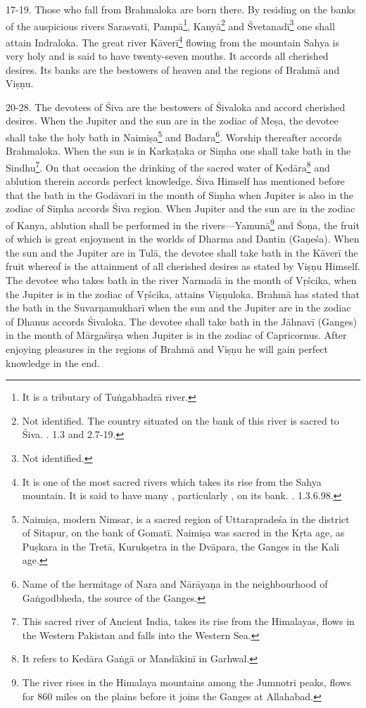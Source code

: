 17-19. Those who fall from Brahmaloka are born there. By residing on the banks
of the auspicious rivers Sarasvatī, Pampā\footnote{It is a tributary of
Tuṅgabhadrā river.}, Kanyā\footnote{Not identified. The country situated on
the bank of this river is sacred to Śiva. . 1.3 and 2.7-19.} and
Śvetanadī\footnote{Not identified.} one shall attain Indraloka. The great river
Kāverī\footnote{It is one of the most sacred rivers which takes its rise from
the Sahya mountain. It is said to have many , particularly , on its bank. . 1.3.6.98.} flowing from the mountain Sahya is
very holy and is said to have twenty-seven mouths. It accords all cherished
desires. Its banks are the bestowers of heaven and the regions of Brahmā and
Viṣṇu.

20-28. The devotees of Śiva are the bestowers of Śivaloka and accord cherished
desires. When the Jupiter and the sun are in the zodiac of Meṣa, the devotee
shall take the holy bath in Naimiṣa\footnote{Naimiṣa, modern Nimsar, is a sacred
region of Uttarapradeśa in the district of Sitapur, on the bank of Gomatī.
Naimiṣa was sacred in the Kṛta age, as Puṣkara in the Tretā, Kurukṣetra in
the Dvāpara, the Ganges in the Kali age.} and Badara\footnote{Name of
the hermitage of Nara and Nārāyaṇa in the neighbourhood of Gaṅgodbheda,
the source of the Ganges.}. Worship \etc thereafter accords Brahmaloka. When
the sun is in Karkaṭaka or Siṃha one shall take bath in the Sindhu\footnote{This
sacred river of Ancient India, takes its rise from the Himalayas, flows in
the Western Pakistan and falls into the Western Sea.}. On that occasion
the drinking of the sacred water of Kedāra\footnote{It refers to Kedāra Gaṅgā or
Mandākinī in Garhwal.} and ablution therein accords perfect knowledge. Śiva
Himself has mentioned before that the bath in the Godāvarī in the month of Siṃha
when Jupiter is also in the zodiac of Siṃha accords Śiva region. When Jupiter
and the sun are in the zodiac of Kanya, ablution shall be performed in
the rivers—Yamunā\footnote{The river rises in the Himalaya mountains among
the Jumnotri peaks, flows for 860 miles on the plains before it joins the Ganges
at Allahabad.} and Śoṇa, the fruit of which is great enjoyment in the worlds of
Dharma and Dantin (Gaṇeśa). When the sun and the Jupiter are in Tulā,
the devotee shall take bath in the Kāverī the fruit whereof is the attainment of
all cherished desires as stated by Viṣṇu Himself. The devotee who takes bath in
the river Narmadā in the month of Vṛścika, when the Jupiter is in the zodiac of
Vṛścika, attains Viṣṇuloka. Brahmā has stated that the bath in
the Suvarṇamukharī when the sun and the Jupiter are in the zodiac of Dhanus
accords Śivaloka. The devotee shall take bath in the Jāhnavī (Ganges) in
the month of Mārgaśīrṣa when Jupiter is in the zodiac of Capricornus. After
enjoying pleasures in the regions of Brahmā and Viṣṇu he will gain perfect
knowledge in the end.

